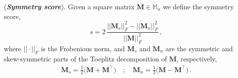 \begin{definition}
\label{def-symmetry-score}
%
(\textbf{\emph{Symmetry score}}).
%
Given a square matrix $\bm{M} \in \mathbb{M}_n$ we define the symmetry score,
%
\begin{equation}
\label{eq:definition-symmetry-score}
    s = 2 \,\dfrac{||\bm{M}_s||_F^2 - ||\bm{M}_n||_F^2}{||\bm{M}||_F^2} \,,
\end{equation}
%
where $|| \cdot ||_F$ is the Frobenious norm, and $\bm{M}_s$ and $\bm{M}_n$ are the symmetric and skew-symmetric parts of the Toeplitz decomposition of $\bm{M}$, respectively,
%
\begin{equation}
\begin{split}
    \bm{M}_s = \frac12\big(\bm{M} + \bm{M}^\top\big) \quad ; \quad
    \bm{M}_n = \frac12\big(\bm{M} -\bm{M}^\top\big) \,.
\end{split}
\end{equation}
%
\end{definition}